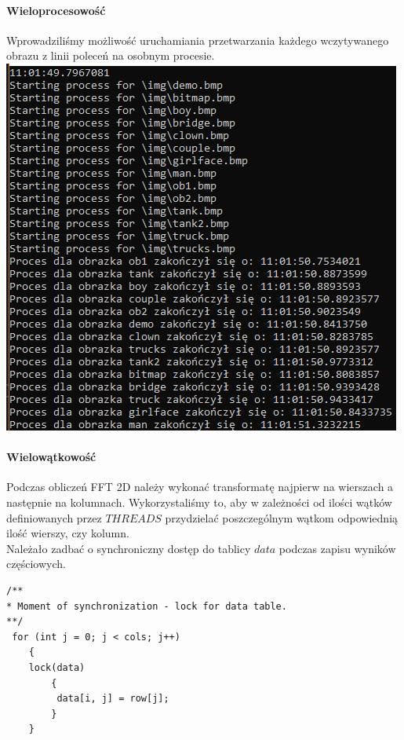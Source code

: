 \paragraph{Wieloprocesowość} Wprowadziliśmy możliwość uruchamiania przetwarzania każdego wczytywanego obrazu z linii poleceń na osobnym procesie.\\
	\includegraphics[scale=1]{figures/Par13Wat4.png}
\paragraph{Wielowątkowość} Podczas obliczeń FFT 2D należy wykonać transformatę najpierw na wierszach a następnie na kolumnach. Wykorzystaliśmy to, aby w zależności od ilości wątków definiowanych przez $THREADS$ przydzielać poszczególnym wątkom odpowiednią ilość wierszy, czy kolumn.\\
Należało zadbać o synchroniczny dostęp do tablicy $data$ podczas zapisu wyników częściowych.\\
\begin{lstlisting}
/**
* Moment of synchronization - lock for data table.
**/
 for (int j = 0; j < cols; j++)
	{
	lock(data)
		{
		 data[i, j] = row[j];
		}
	}
\end{lstlisting}
 
\clearpage\newpage

\clearpage\newpage

